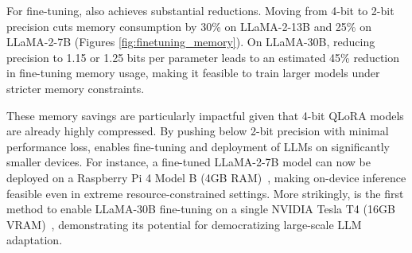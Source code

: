 For fine-tuning, \FWName also achieves substantial reductions. Moving from 4-bit to 2-bit precision cuts memory consumption by 30\% on LLaMA-2-13B and 25\% on LLaMA-2-7B (Figures \ref{fig:finetuning_memory}). On LLaMA-30B, reducing precision to 1.15 or 1.25 bits per parameter leads to an estimated 45\% reduction in fine-tuning memory usage, making it feasible to train larger models under stricter memory constraints.

These memory savings are particularly impactful given that 4-bit QLoRA models are already highly compressed. By pushing below 2-bit precision with minimal performance loss, \FWName enables fine-tuning and deployment of LLMs on significantly smaller devices. For instance, a fine-tuned LLaMA-2-7B model can now be deployed on a Raspberry Pi 4 Model B (4GB RAM)~\cite{raspberry_pi_4_model_b}, making on-device inference feasible even in extreme resource-constrained settings. More strikingly, \FWName is the first method to enable LLaMA-30B fine-tuning on a single NVIDIA Tesla T4 (16GB VRAM)~\cite{nvidia_t4_virtualization_datasheet}, demonstrating its potential for democratizing large-scale LLM adaptation.

\begin{table}[ht]
    \centering
    \vspace{5pt}
    \caption{\
    \textbf{Performance of different methods on LLaMA-33B}. \FWName allows us to fine-tune LLMs at a precision level of as low as 1.15 bits, without significantly sacrificing accuracy.}
    \vspace{-15pt}
    \label{tab:low_bit_experiment}
\end{table}